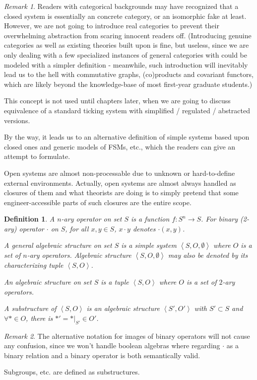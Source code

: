 \documentclass{book}
\newtheorem{definition}{Definition}
\theoremstyle{definition}\newtheorem{mechanism}{Mechanism}
\theoremstyle{remark}\newtheorem*{remark}{Remark}
\begin{document}
\begin{remark}
	Readers with categorical backgrounds may have recognized that a closed system is essentially an concrete category, or an isomorphic fake at least. However, we are not going to introduce real categories to prevent their overwhelming abstraction from scaring innocent readers off. (Introducing genuine categories as well as existing theories built upon is fine, but useless, since we are only dealing with a few specialized instances of general categories with could be modeled with a simpler definition - meanwhile, such introduction will inevitably lead us to the hell with commutative graphs, (co)products and covariant functors, which are likely beyond the knowledge-base of most first-year graduate students.) 
	
	This concept is not used until chapters later, when we are going to discuss equivalence of a standard ticking system with simplified / regulated / abstracted versions.
	
	By the way, it leads us to an alternative definition of simple systems based upon closed ones and generic models of FSMs, etc., which the readers can give an attempt to formulate. 
	
	Open systems are almost non-processable due to unknown or hard-to-define external environments. Actually, open systems are almost always handled as closures of them and what theorists are doing is to simply pretend that some engineer-accessible parts of such closures are the entire scope.
\end{remark}

\begin{definition}
	A $n$-ary operator on set $S$ is a function $f: S^n\to S$. For binary (2-ary) operator $\cdot$ on $S$, for all $x, y\in S$, $x\cdot y$ denotes $\cdot(x, y)$.
	
	A general algebraic structure on set $S$ is a simple system $\left<S, O, \emptyset\right>$ where $O$ is a set of $n$-ary operators. Algebraic structure $\left<S, O, \emptyset\right>$ may also be denoted by its characterizing tuple $\left<S, O\right>$.
	
	An algebraic structure on set $S$ is a tuple $\left<S, O\right>$ where $O$ is a set of $2$-ary operators.
	
	A substructure of $\left<S, O\right>$ is an algebraic structure $\left<S', O'\right>$ with $S'\subset S$ and $\forall *\in O$, there is $*' = *|_{S'}\in O'$.
\end{definition}

\begin{remark}
	The alternative notation for images of binary operators will not cause any confusion, since we won't handle boolean algebras where regarding $\cdot$ as a binary relation and a binary operator is both semantically valid.
	
	Subgroups, etc. are defined as substructures.
\end{remark}
\end{document}
